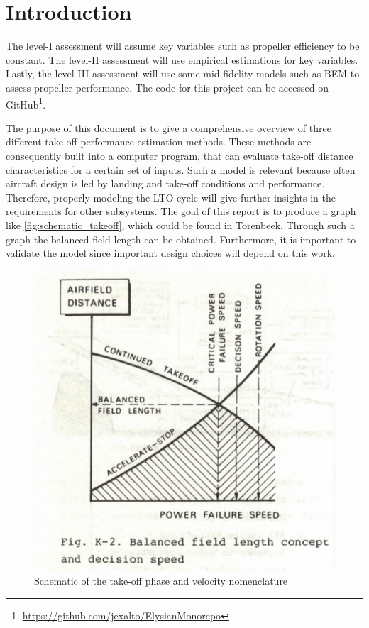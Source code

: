 \chapter{Introduction}\label{chapter:introduction}
The level-I assessment will assume key variables such as propeller efficiency to be constant. The level-II assessment will use empirical estimations for key variables. Lastly, the level-III assessment will use some mid-fidelity models such as BEM to assess propeller performance. The code for this project can be accessed on GitHub\footnote{\url{https://github.com/jexalto/ElysianMonorepo}}.

The purpose of this document is to give a comprehensive overview of three different take-off performance estimation methods. These methods are consequently built into a computer program, that can evaluate take-off distance characteristics for a certain set of inputs. Such a model is relevant because often aircraft design is led by landing and take-off conditions and performance. Therefore, properly modeling the LTO cycle will give further insights in the requirements for other subsystems. The goal of this report is to produce a graph like \autoref{fig:schematic_takeoff}, which could be found in Torenbeek. Through such a graph the balanced field length can be obtained. Furthermore, it is important to validate the model since important design choices will depend on this work.

\begin{figure}[!ht]
    \centering
    \includegraphics[width=0.5\linewidth]{figures/s_distance.png}
    \caption{Schematic of the take-off phase and velocity nomenclature}
    \label{fig:schematic_takeoff}
\end{figure}